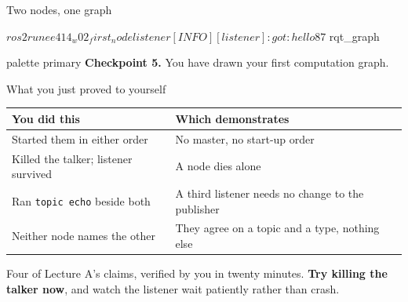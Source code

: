 \documentclass[aspectratio=169]{beamer}
\begin{document}
\begin{frame}[fragile]{Two nodes, one graph}
  \begin{shells}
$ ros2 run ee414_w02_first_node listener
[INFO] [listener]: got: hello 87

$ rqt_graph
  \end{shells}

  \vspace{0.4em}
  \begin{center}
  \end{center}

  \vspace{0.2em}
  \centering
  \begin{beamercolorbox}[sep=5pt,center,rounded=true]{palette primary}
    \footnotesize \textbf{Checkpoint 5.} You have drawn your first computation graph.
  \end{beamercolorbox}
\end{frame}

\begin{frame}{What you just proved to yourself}
  \small
  \begin{center}
  \begin{tabular}{@{}p{4.6cm}p{6.4cm}@{}}
    \toprule
    \textbf{You did this} & \textbf{Which demonstrates} \\
    \midrule
    Started them in either order & No master, no start-up order \\[0.3em]
    Killed the talker; listener survived & A node dies alone \\[0.3em]
    Ran \texttt{topic echo} beside both & A third listener needs no change to the publisher \\[0.3em]
    Neither node names the other & They agree on a topic and a type, nothing else \\
    \bottomrule
  \end{tabular}
  \end{center}

  \vspace{0.7em}
  \centering
  Four of Lecture A's claims, verified by you in twenty minutes. \textbf{Try killing the
  talker now}, and watch the listener wait patiently rather than crash.
\end{frame}
\end{document}
